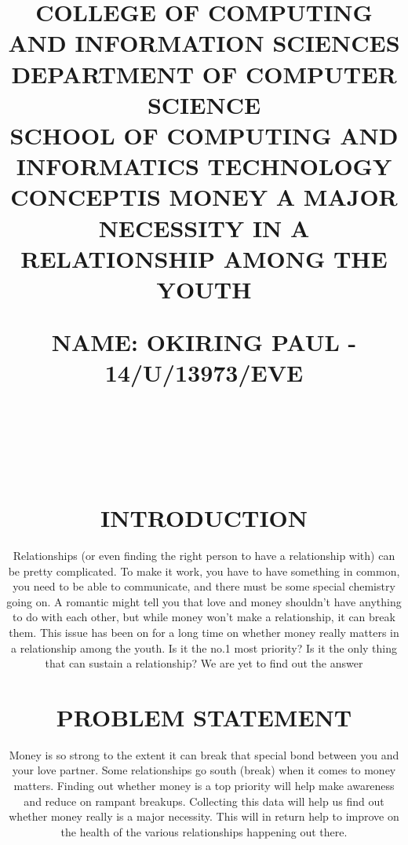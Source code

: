 \documentclass[12pt,letterpaper]{article}
\begin{document}
\title{COLLEGE OF COMPUTING AND INFORMATION SCIENCES\\ DEPARTMENT OF COMPUTER SCIENCE\\ SCHOOL OF COMPUTING AND INFORMATICS TECHNOLOGY\\}
\maketitle

\title{NAME:	         OKIRING PAUL   - 14/U/13973/EVE   
\maketitle
\\
\\
\begin{center}
\title {\textbf{CONCEPT}}
\end{center}
\title{\textbf{IS MONEY A MAJOR NECESSITY IN A RELATIONSHIP AMONG THE YOUTH}}
\maketitle

\section{INTRODUCTION}
Relationships (or even finding the right person to have a relationship with) can be pretty complicated. To make it work, you have to have something in common, you need to be able to communicate, and there must be some special chemistry going on. A romantic might tell you that love and money shouldn’t have anything to do with each other, but while money won’t make a relationship, it can break them. This issue has been on for a long time on whether money really matters in a relationship among the youth. Is it the no.1 most priority? Is it the only thing that can sustain a relationship? We are yet to find out the answer

\section{PROBLEM STATEMENT}
Money is so strong to the extent it can break that special bond between you and your love partner. Some relationships go south (break) when it comes to money matters. Finding out whether money is a top priority will help make awareness and reduce on rampant breakups.  Collecting this data will help us find out whether money really is a major necessity. This will in return help to improve on the health of the various relationships happening out there.

}
\end{document}
